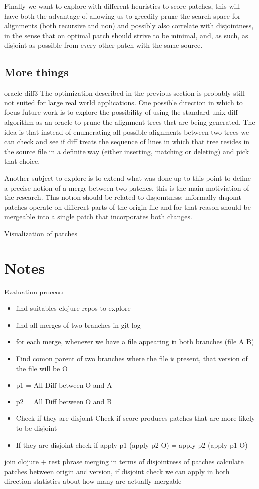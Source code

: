 \documentclass[11pt]{article}
\begin{document}
Finally we want to explore with different heuristics to score patches, this will 
have both the advantage of allowing us to greedily prune the search space for 
alignments (both recursive and non) and possibly also correlate with 
disjointness, in the sense that on optimal patch should strive to be minimal, 
and, as such, as disjoint as possible from every other patch with the same source.

\subsection{More things}
oracle diff3
The optimization described in the previous section is probably still not suited 
for large real world applications. One possible direction in which to focus future work is to explore the 
possibility of using the standard unix diff algorithm as an oracle to prune the 
alignment trees that are being generated. 
The idea is that instead of enumerating all possible alignments between two 
trees we can check and see if diff treats the sequence of lines in which that 
tree resides in the source file in a definite way (either inserting, matching or deleting) 
and pick that choice.

Another subject to explore is to extend what was done up to this point to define 
a precise notion of a merge between two patches, this is the main motiviation of the 
research. This notion should be related to disjointness: informally disjoint 
patches operate on different parts of the origin file and for that reason should 
be mergeable into a single patch that incorporates both changes. 

Visualization of patches



\section{Notes}
Evaluation process:
\begin{itemize}
   \item find suitables clojure repos to explore
  \item find all merges of two branches in git log
  \item for each merge, whenever we have a file appearing in both branches (file A B)
  \item Find comon parent of two branches where the file is present, that version of the file will be O
  \item p1 = All Diff between O and A
  \item p2 = All Diff between O and B 
  \item Check if they are disjoint
      \subitem Check if score produces patches that are more likely to be disjoint
  \item If they are disjoint check if apply p1 (apply p2 O) = apply p2 (apply p1 O)
  
\end{itemize}
 

join clojure + rest phrase merging in terms of disjointness of patches
calculate patches between origin and version, if disjoint check we can
apply in both direction statistics about how many are actually mergable
\end{document}

